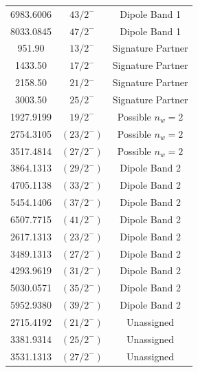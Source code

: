 \begin{center}
\begin{longtable}{|c|c|c|}
 6983.6006 &$ 43/2^{-} $& Dipole Band 1 \\
 8033.0845 &$ 47/2^{-} $& Dipole Band 1 \\
 951.90 &$ 13/2^{-} $& Signature Partner \\
 1433.50 &$ 17/2^{-} $& Signature Partner \\
 2158.50 &$ 21/2^{-} $& Signature Partner \\
 3003.50 &$ 25/2^{-} $& Signature Partner \\
 1927.9199 &$ 19/2^{-} $& Possible $n_w=2$ \\
 2754.3105 &$ (23/2^{-}) $& Possible $n_w=2$ \\
 3517.4814 &$ (27/2^{-}) $& Possible $n_w=2$ \\
 3864.1313 &$ (29/2^{-}) $& Dipole Band 2 \\
 4705.1138 &$ (33/2^{-}) $& Dipole Band 2 \\
 5454.1406 &$ (37/2^{-}) $& Dipole Band 2 \\
 6507.7715 &$ (41/2^{-}) $& Dipole Band 2 \\
 2617.1313 &$ (23/2^{-}) $& Dipole Band 2 \\
 3489.1313 &$ (27/2^{-}) $& Dipole Band 2 \\
 4293.9619 &$ (31/2^{-}) $& Dipole Band 2 \\
 5030.0571 &$ (35/2^{-}) $& Dipole Band 2 \\
 5952.9380 &$ (39/2^{-}) $& Dipole Band 2 \\
 2715.4192 &$ (21/2^{-}) $& Unassigned \\
 3381.9314 &$ (25/2^{-}) $& Unassigned \\
 3531.1313 &$ (27/2^{-}) $& Unassigned \\
\hline \hline
\end{longtable}
\end{center}


